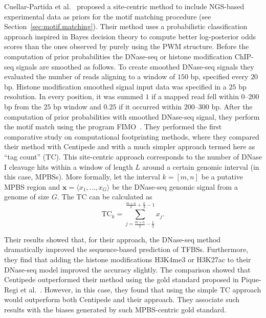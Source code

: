 Cuellar-Partida et al.~\cite{cuellar2012} proposed a site-centric method to include NGS-based experimental data as priors for the motif matching procedure (see Section~\ref{sec:motif.matching}). Their method uses a probabilistic classification approach inspired in Bayes decision theory to compute better log-posterior odds scores than the ones observed by purely using the PWM structure. Before the computation of prior probabilities the DNase-seq or histone modification ChIP-seq signals are smoothed as follows. To create smoothed DNase-seq signals they evaluated the number of reads aligning to a window of $150$ bp, specified every $20$ bp. Histone modification smoothed signal input data was specified in a $25$ bp resolution. In every position, it was summed $ 1 $ if a mapped read fell within $0$--$200$ bp from the $25$ bp window and $ 0.25 $ if it occurred within $200$--$300$ bp. After the computation of prior probabilities with smoothed DNase-seq signal, they perform the motif match using the program FIMO~\cite{grant2011}. They performed the first comparative study on computational footprinting methods, where they compared their method with Centipede and with a much simpler approach termed here as ``tag count'' (TC). This site-centric approach corresponds to the number of DNase I cleavage hits within a window of length $L$ around a certain genomic interval (in this case, MPBSs). More formally, let the interval ${k} = [{m},{n}]$ be a putative MPBS region and $\mathbf{x} = \langle x_1, ..., x_G\rangle$ be the DNase-seq genomic signal from a genome of size $G$. The TC can be calculated as 
\begin{equation}
  \label{eq:tc}
  \text{TC}_{k} = \sum_{j={\frac{m+n}{2}-\frac{L}{2}}}^{\frac{m+n}{2}+\frac{L}{2}-1} {x}_{j}.
\end{equation}

Their results showed that, for their approach, the DNase-seq method dramatically improved the sequence-based prediction of TFBSs. Furthermore, they find that adding the histone modifications H3K4me3 or H3K27ac to their DNase-seq model improved the accuracy slightly. The comparison showed that Centipede outperformed their method using the gold standard proposed in Pique-Regi et al.~\cite{pique2011}. However, in this case, they found that using the simple TC approach would outperform both Centipede and their approach. They associate such results with the biases generated by such MPBS-centric gold standard.

